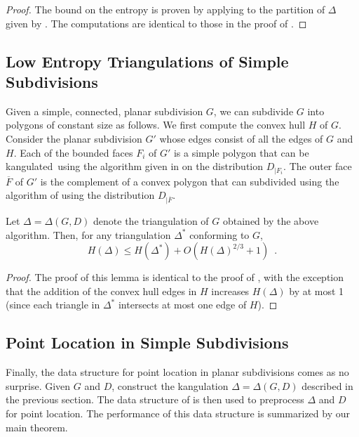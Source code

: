 \documentclass[charterfonts,lotsofwhite]{patmorin}
\newcommand{\kangulated}{kangulated}
\begin{document}
\begin{proof}
The bound on the entropy is proven by applying  to the
partition of $\Delta$ given by . The computations
are identical to those in the proof of .
\end{proof}



\subsection{Low Entropy Triangulations of Simple Subdivisions}

Given a simple, connected, planar subdivision $G$, we can subdivide
$G$ into polygons of constant size as follows.  We first compute the
convex hull $H$ of $G$.  Consider the planar subdivision $G'$ whose
edges consist of all the edges of $G$ and $H$.  Each of the bounded
faces $F_i$ of $G'$ is a simple polygon that can be \kangulated\ using the
algorithm given in  on the distribution
$D_{\mid F_i}$.  The outer face $\overline{F}$ of $G'$ is the
complement of a convex polygon that can subdivided using the algorithm
of  using the distribution $D_{\mid \overline{F}}$.

\begin{lem}
Let $\Delta=\Delta(G,D)$ denote the triangulation of $G$ obtained by
the above algorithm. 
Then, for any triangulation $\Delta^*$ conforming to $G$,
\[
    H(\Delta) \le H(\Delta^*) + O(H(\Delta)^{2/3}+1) \enspace .
\]
\end{lem}

\begin{proof}
The proof of this lemma is identical to the proof of
, with the exception that the addition of the
convex hull edges in $H$ increases $H(\Delta)$ by at most 1 (since
each triangle in $\Delta^*$ intersects at most one edge of $H$).
\end{proof}

\subsection{Point Location in Simple Subdivisions}

Finally, the data structure for point location in planar subdivisions
comes as no surprise.  Given $G$ and $D$, construct the kangulation
$\Delta=\Delta(G,D)$ described in the previous section.  The data
structure of  is then used to preprocess $\Delta$ and
$D$ for point location.  The performance of this data structure is
summarized by our main theorem.
\end{document}
